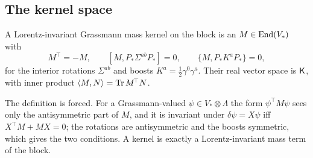 \subsection{The kernel space}

\begin{definition}
\label{def:kernel}
A Lorentz-invariant Grassmann mass kernel on the block is an $M\in\operatorname{End}(V_*)$ with
\[
M^{\!\top}=-M,\qquad [M,P_*\Sigma^{ab}P_*]=0,\qquad \{M,P_*K^aP_*\}=0 ,
\]
for the interior rotations $\Sigma^{ab}$ and boosts $K^a=\tfrac12\gamma^0\gamma^a$. Their real vector space is $\mathsf K$, with inner product
$\langle M,N\rangle=\operatorname{Tr} M^{\!\top}N$.
\end{definition}

The definition is forced. For a Grassmann-valued $\psi\in V_*\otimes\Lambda$ the form $\psi^{\!\top}M\psi$ sees only the antisymmetric part of
$M$, and it is invariant under $\delta\psi=X\psi$ iff $X^{\!\top}M+MX=0$; the rotations are antisymmetric and the boosts symmetric, which gives the
two conditions. A kernel is exactly a Lorentz-invariant mass term of the block.

